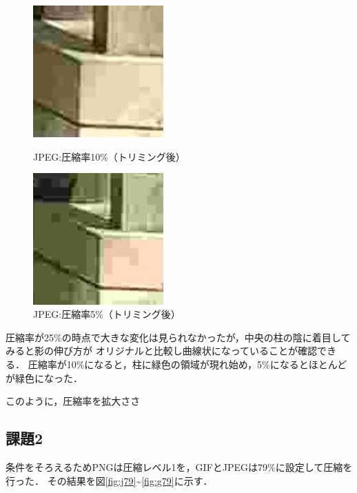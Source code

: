 \documentclass[a4paper,11pt]{bxjsarticle}
\begin{document}
 \begin{figure}[htbp]
  \begin{minipage}{0.5\hsize}
   \begin{center}
    \includegraphics[width=50mm]{sample_j10_tri.jpg}
   \end{center}
   \caption{JPEG:圧縮率10\%（トリミング後）}
   \label{fig:j10_tri}
  \end{minipage}
  \begin{minipage}{0.5\hsize}
   \begin{center}
    \includegraphics[width=50mm]{sample_j5_tri.jpg}
   \end{center}
   \caption{JPEG:圧縮率5\%（トリミング後）}
   \label{fig:j5_tri}
  \end{minipage}
 \end{figure}

 圧縮率が25\%の時点で大きな変化は見られなかったが，中央の柱の陰に着目してみると影の伸び方が
 オリジナルと比較し曲線状になっていることが確認できる．
 圧縮率が10\%になると，柱に緑色の領域が現れ始め，5\%になるとほとんどが緑色になった．

このように，圧縮率を拡大ささ





  \subsection{課題2}
    条件をそろえるためPNGは圧縮レベル1を，GIFとJPEGは79\%に設定して圧縮を行った．
    その結果を図\ref{fig:j79}\textasciitilde\ref{fig:g79}に示す．
\end{document}
